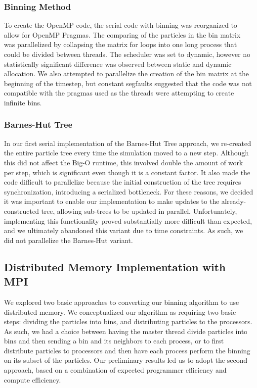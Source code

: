 \documentclass{article}
\begin{document}
\subsubsection{Binning Method}
To create the OpenMP code, the serial code with binning was reorganized to allow
for OpenMP Pragmas. The comparing of the particles in the bin matrix was
parallelized by collapsing the matrix for loops into one long process that could
be divided between threads. The scheduler was set to dynamic, however no
statistically significant difference was observed between static and dynamic
allocation. We also attempted to parallelize the creation of the bin matrix at
the beginning of the timestep, but constant segfaults suggested that the code
was not compatible with the pragmas used as the threads were attempting to
create infinite bins.
\subsubsection{Barnes-Hut Tree}
In our first serial implementation of the Barnes-Hut Tree approach, we
re-created the entire particle tree every time the simulation moved to a new
step. Although this did not affect the Big-O runtime, this involved double the
amount of work per step, which is significant even though it is a constant
factor. It also made the code difficult to parallelize because the initial
construction of the tree requires synchronization, introducing a serialized
bottleneck. For these reasons, we decided it was important to enable our
implementation to make updates to the already-constructed tree, allowing
sub-trees to be updated in parallel. Unfortunately, implementing this
functionality proved substantially more difficult than expected, and we
ultimately abandoned this variant due to time constraints. As such, we did not
parallelize the Barnes-Hut variant.

\subsection{Distributed Memory Implementation with MPI}
We explored two basic approaches to converting our binning algorithm to use
distributed memory. We conceptualized our algorithm as requiring two basic
steps: dividing the particles into bins, and distributing particles to the
processors. As such, we had a choice between having the master thread divide
particles into bins and then sending a bin and its neighbors to each process, or
to first distribute particles to processors and then have each process perform
the binning on its subset of the particles. Our preliminary results led us to
adopt the second approach, based on a combination of expected programmer
efficiency and compute efficiency.
\end{document}
